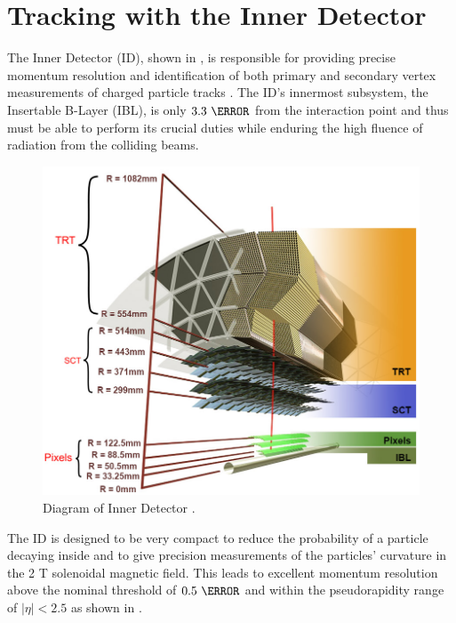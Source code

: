 \section{Tracking with the Inner Detector} \label{sec:atlas:tracking}

The Inner Detector (ID), shown in , is
responsible for providing precise momentum resolution and identification of
both primary and secondary vertex measurements of charged particle tracks
\cite{ATLAS-TDR-4,ATLAS-TDR-5}.  The ID's innermost subsystem, the Insertable
B-Layer (IBL), is only $3.3~\cm$ from the interaction point
\cite{Potamianos:2209070} and thus must be able to perform its crucial duties
while enduring the high fluence of radiation from the colliding beams.

\begin{figure}[!htbp]
  \begin{center}
    \includegraphics[width=0.8\linewidth]{figures/atlas/inner_detector_diagram}
    \caption{Diagram of Inner Detector \cite{Potamianos:2209070}.}
    \label{fig:inner_detector_diagram}
  \end{center}
\end{figure}

The ID is designed to be very compact to reduce the probability of a particle
decaying inside and to give precision measurements of the particles' curvature in
the 2 T solenoidal magnetic field. This leads to excellent momentum resolution
above the nominal \pT threshold of $0.5~\GeV$ and within the pseudorapidity range
of $|\eta| < 2.5$ as shown in .

